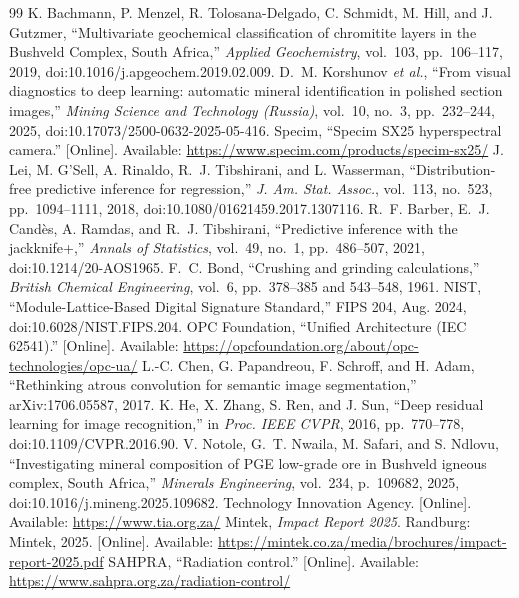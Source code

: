 \documentclass[10pt,a4paper,twocolumn]{article}
\begin{document}
\begin{thebibliography}{99}
 K. Bachmann, P. Menzel, R. Tolosana-Delgado, C. Schmidt, M. Hill, and J. Gutzmer, ``Multivariate geochemical classification of chromitite layers in the Bushveld Complex, South Africa,'' \emph{Applied Geochemistry}, vol.~103, pp.~106--117, 2019, doi:10.1016/j.apgeochem.2019.02.009.
 D.~M. Korshunov \emph{et al.}, ``From visual diagnostics to deep learning: automatic mineral identification in polished section images,'' \emph{Mining Science and Technology (Russia)}, vol.~10, no.~3, pp.~232--244, 2025, doi:10.17073/2500-0632-2025-05-416.
 Specim, ``Specim SX25 hyperspectral camera.'' [Online]. Available: \url{https://www.specim.com/products/specim-sx25/}
 J. Lei, M. G'Sell, A. Rinaldo, R.~J. Tibshirani, and L. Wasserman, ``Distribution-free predictive inference for regression,'' \emph{J. Am. Stat. Assoc.}, vol.~113, no.~523, pp.~1094--1111, 2018, doi:10.1080/01621459.2017.1307116.
 R.~F. Barber, E.~J. Cand\`{e}s, A. Ramdas, and R.~J. Tibshirani, ``Predictive inference with the jackknife+,'' \emph{Annals of Statistics}, vol.~49, no.~1, pp.~486--507, 2021, doi:10.1214/20-AOS1965.
 F.~C. Bond, ``Crushing and grinding calculations,'' \emph{British Chemical Engineering}, vol.~6, pp.~378--385 and 543--548, 1961.
 NIST, ``Module-Lattice-Based Digital Signature Standard,'' FIPS 204, Aug. 2024, doi:10.6028/NIST.FIPS.204.
 OPC Foundation, ``Unified Architecture (IEC 62541).'' [Online]. Available: \url{https://opcfoundation.org/about/opc-technologies/opc-ua/}
 L.-C. Chen, G. Papandreou, F. Schroff, and H. Adam, ``Rethinking atrous convolution for semantic image segmentation,'' arXiv:1706.05587, 2017.
 K. He, X. Zhang, S. Ren, and J. Sun, ``Deep residual learning for image recognition,'' in \emph{Proc. IEEE CVPR}, 2016, pp.~770--778, doi:10.1109/CVPR.2016.90.
 V. Notole, G.~T. Nwaila, M. Safari, and S. Ndlovu, ``Investigating mineral composition of PGE low-grade ore in Bushveld igneous complex, South Africa,'' \emph{Minerals Engineering}, vol.~234, p.~109682, 2025, doi:10.1016/j.mineng.2025.109682.
 Technology Innovation Agency. [Online]. Available: \url{https://www.tia.org.za/}
 Mintek, \emph{Impact Report 2025}. Randburg: Mintek, 2025. [Online]. Available: \url{https://mintek.co.za/media/brochures/impact-report-2025.pdf}
 SAHPRA, ``Radiation control.'' [Online]. Available: \url{https://www.sahpra.org.za/radiation-control/}

\end{thebibliography}
\end{document}
